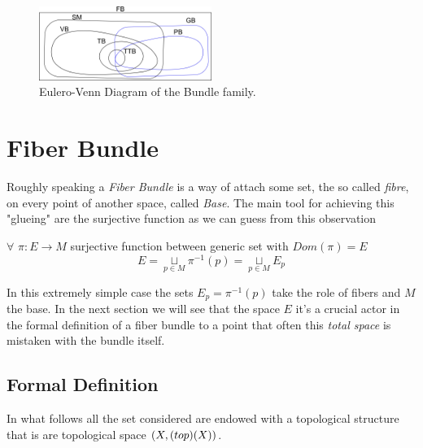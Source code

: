 \documentclass[a4paper,12pt]{scrartcl}    %
\begin{document}
\begin{figure}[h!]
  \caption{Eulero-Venn Diagram of the Bundle family.}
   	\includegraphics[width=0.5\textwidth]{Pictures/EuleroVenn_Bundles} 
  \centering
\end{figure}



\newpage
\section{Fiber Bundle}
Roughly speaking a \emph{Fiber Bundle} is a way of attach some set, the so called \emph{fibre}, on every point of another space, called \emph{Base}.
The main tool for achieving this "glueing" are the surjective function as we can guess from this observation

\begin{observation}\label{oss:BasicBundle}
$\forall$ $\pi : E \rightarrow M $ surjective function between generic set with $Dom(\pi)=E$
$$ E = \underset{p \in M}{\sqcup} \pi^{-1}(p)= \underset{p \in M}{\sqcup} E_{p}$$
\end{observation}
In this extremely simple case the sets $E_{p} =\pi^{-1}(p)$ take the role of fibers and $M$ the base. In the next section we will see that the space $E$ it's a crucial actor in the formal definition of a fiber bundle to a point that often this \emph{total space} is mistaken with the bundle itself. \cite{freed}


\subsection{Formal Definition}
\begin{remark}
In what follows all the set considered are endowed with a topological structure that is are topological space  $(X,\textrm(top)(X))$.
\end{remark}
\end{document}

